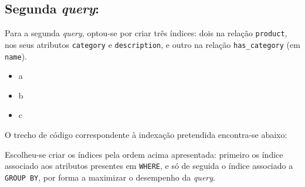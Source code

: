 \documentclass[12pt,a4paper]{article}
\begin{document}
\subsection*{Segunda \textit{query}:}



Para a segunda \textit{query}, optou-se por criar três índices: dois na relação
\texttt{product}, nos seus atributos \texttt{category} e \texttt{description},
e outro na relação \texttt{has\_category} (em \texttt{name}).

\vspace*{0.25cm}

\begin{itemize}
  \item a
  \item b
  \item c
\end{itemize}

O trecho de código correspondente à indexação pretendida encontra-se abaixo:



Escolheu-se criar os índices pela ordem acima apresentada: primeiro os índice associado
aos atributos presentes em \texttt{WHERE}, e só de seguida o índice associado
a \texttt{GROUP BY}, por forma a maximizar o desempenho da \textit{query}.

\end{document}

